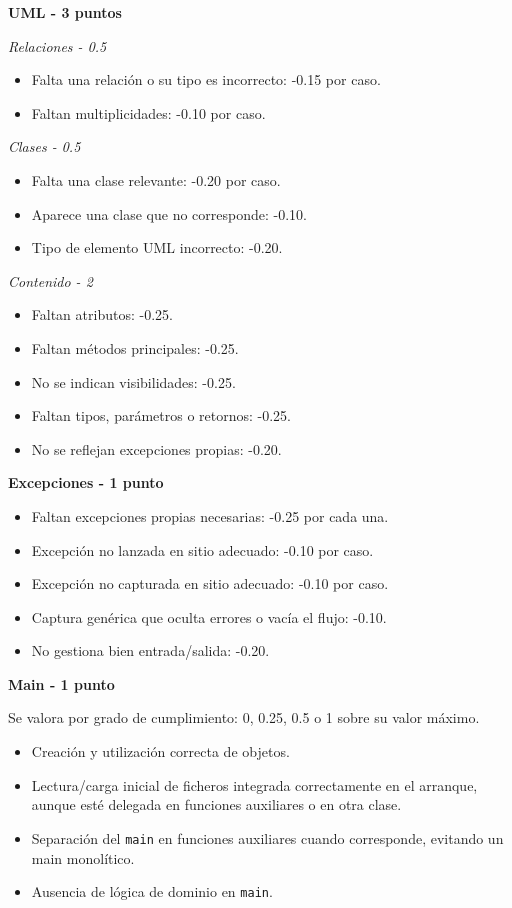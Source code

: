 \documentclass[10pt,a4paper]{article}
\newcommand{\bloque}[2]{\vspace{3pt}\textbf{#1\if\relax\detokenize{#2}\relax\else{} - #2\fi}\par}
\newcommand{\subbloque}[2]{\textit{#1 - #2}\par}
\begin{document}
\bloque{UML}{3 puntos}
\subbloque{Relaciones}{0.5}
\begin{itemize}
    \item Falta una relación o su tipo es incorrecto: -0.15 por caso.
    \item Faltan multiplicidades: -0.10 por caso.
\end{itemize}
\subbloque{Clases}{0.5}
\begin{itemize}
    \item Falta una clase relevante: -0.20 por caso.
    \item Aparece una clase que no corresponde: -0.10.
    \item Tipo de elemento UML incorrecto: -0.20.
\end{itemize}
\subbloque{Contenido}{2}
\begin{itemize}
    \item Faltan atributos: -0.25.
    \item Faltan métodos principales: -0.25.
    \item No se indican visibilidades: -0.25.
    \item Faltan tipos, parámetros o retornos: -0.25.
    \item No se reflejan excepciones propias: -0.20.
\end{itemize}

\bloque{Excepciones}{1 punto}
\begin{itemize}
    \item Faltan excepciones propias necesarias: -0.25 por cada una.
    \item Excepción no lanzada en sitio adecuado: -0.10 por caso.
    \item Excepción no capturada en sitio adecuado: -0.10 por caso.
    \item Captura genérica que oculta errores o vacía el flujo: -0.10.
    \item No gestiona bien entrada/salida: -0.20.
\end{itemize}

\newpage

\bloque{Main}{1 punto}
Se valora por grado de cumplimiento: 0, 0.25, 0.5 o 1 sobre su valor máximo.

\begin{itemize}
    \item Creación y utilización correcta de objetos.
    \item Lectura/carga inicial de ficheros integrada correctamente en el arranque, aunque esté delegada en funciones auxiliares o en otra clase.
    \item Separación del \texttt{main} en funciones auxiliares cuando corresponde, evitando un main monolítico.
    \item Ausencia de lógica de dominio en \texttt{main}.
\end{itemize}
\end{document}
